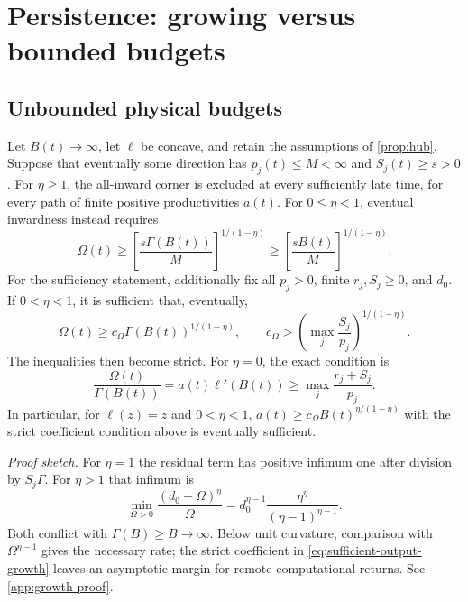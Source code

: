 \section{Persistence: growing versus bounded budgets}
\label{sec:persistence}

\subsection{Unbounded physical budgets}

\begin{proposition}
\label{prop:growth-trichotomy}
Let $B(t)\to\infty$, let $\ell$ be concave, and retain the assumptions
of \cref{prop:hub}. Suppose that eventually some direction has
$p_j(t)\leq M<\infty$ and $S_j(t)\geq s>0$.
For $\eta\geq1$, the all-inward corner is excluded at every sufficiently
late time, for every path of finite positive productivities $a(t)$.
For $0\leq\eta<1$, eventual inwardness instead requires
\begin{equation}
 \Omega(t)\geq
 \left[\frac{s\Gamma(B(t))}{M}\right]^{1/(1-\eta)}
 \geq\left[\frac{sB(t)}{M}\right]^{1/(1-\eta)}.
 \label{eq:necessary-output-growth}
\end{equation}
For the sufficiency statement, additionally fix all $p_j>0$, finite
$r_j,S_j\geq0$, and $d_0$. If $0<\eta<1$, it is sufficient that,
eventually,
\begin{equation}
 \Omega(t)\geq c_\Omega\Gamma(B(t))^{1/(1-\eta)},\qquad
 c_\Omega>
 \left(\max_j\frac{S_j}{p_j}\right)^{1/(1-\eta)}.
 \label{eq:sufficient-output-growth}
\end{equation}
The inequalities then become strict. For $\eta=0$, the exact condition is
\begin{equation}
 \frac{\Omega(t)}{\Gamma(B(t))}=a(t)\ell'(B(t))
 \geq\max_j\frac{r_j+S_j}{p_j}.
 \label{eq:linear-value-growth}
\end{equation}
In particular, for $\ell(z)=z$ and $0<\eta<1$,
$a(t)\geq c_\Omega B(t)^{\eta/(1-\eta)}$ with the strict coefficient
condition above is eventually sufficient.
\end{proposition}
\noindent\emph{Proof sketch.}
For $\eta=1$ the residual term has positive infimum one after division
by $S_j\Gamma$. For $\eta>1$ that infimum is
\begin{equation}
 \min_{\Omega>0}\frac{(d_0+\Omega)^\eta}{\Omega}
 =d_0^{\eta-1}\frac{\eta^\eta}{(\eta-1)^{\eta-1}}.
 \label{eq:residual-minimum}
\end{equation}
Both conflict with $\Gamma(B)\geq B\to\infty$. Below unit curvature,
comparison with $\Omega^{\eta-1}$ gives the necessary rate; the strict
coefficient in \cref{eq:sufficient-output-growth} leaves an asymptotic
margin for remote computational returns. See \cref{app:growth-proof}.

